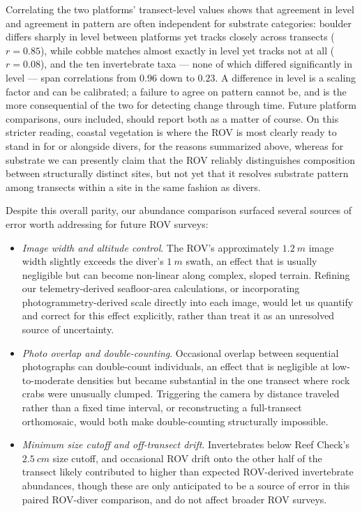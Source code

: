 \documentclass[11pt]{article}
\begin{document}
Correlating the two platforms' transect-level values shows that agreement in
level and agreement in pattern are often independent for substrate 
categories: boulder differs sharply in level between platforms yet tracks 
closely across transects ($r=0.85$), while cobble matches almost exactly in 
level yet tracks not at all ($r=0.08$), and the ten invertebrate taxa --- none 
of which differed significantly in level --- span correlations from $0.96$ down 
to $0.23$.
A difference in level is a scaling factor and can be calibrated; a failure to
agree on pattern cannot be, and is the more consequential of the two for
detecting change through time.
Future platform comparisons, ours included, should report both as a matter of
course.
On this stricter reading, coastal vegetation is where the ROV is most clearly
ready to stand in for or alongside divers, for the reasons summarized above,
whereas for substrate we can presently claim that the ROV reliably
distinguishes composition between structurally distinct sites, but not yet
that it resolves substrate pattern among transects within a site in the same 
fashion as divers. 

Despite this overall parity, our abundance comparison surfaced several
sources of error worth addressing for future ROV surveys:

\begin{itemize}
\item \textit{Image width and altitude control}. The ROV's approximately
$1.2~m$ image width slightly exceeds the diver's $1~m$ swath, an effect that
is usually negligible but can become non-linear along complex, sloped
terrain.
Refining our telemetry-derived seafloor-area calculations, or incorporating
photogrammetry-derived scale directly into each image, would let us quantify and
correct for this effect explicitly, rather than treat it as an unresolved
source of uncertainty.
\item \textit{Photo overlap and double-counting}. Occasional overlap between
sequential photographs can double-count individuals, an effect that is
negligible at low-to-moderate densities but became substantial in the one
transect where rock crabs were unusually clumped.
Triggering the camera by distance traveled rather than a fixed time interval,
or reconstructing a full-transect orthomosaic, would both make double-counting 
structurally impossible.
\item \textit{Minimum size cutoff and off-transect drift}. Invertebrates
below Reef Check's $2.5~cm$ size cutoff, and occasional ROV drift onto the
other half of the transect likely contributed to higher than expected
ROV-derived invertebrate abundances, though these are only anticipated to be
a source of error in this paired ROV-diver comparison, and do not affect
broader ROV surveys.
\end{itemize}
\end{document}
